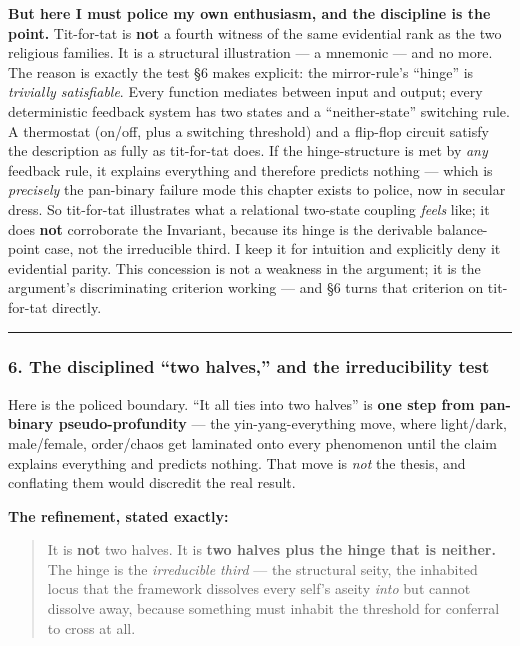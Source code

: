\documentclass[11pt]{article}
\begin{document}
\textbf{But here I must police my own enthusiasm, and the discipline is the point.} Tit-for-tat is \textbf{not} a fourth witness of the same evidential rank as the two religious families. It is a structural illustration — a mnemonic — and no more. The reason is exactly the test §6 makes explicit: the mirror-rule's ``hinge'' is \emph{trivially satisfiable}. Every function mediates between input and output; every deterministic feedback system has two states and a ``neither-state'' switching rule. A thermostat (on/\allowbreak{}off, plus a switching threshold) and a flip-flop circuit satisfy the description as fully as tit-for-tat does. If the hinge-structure is met by \emph{any} feedback rule, it explains everything and therefore predicts nothing — which is \emph{precisely} the pan-binary failure mode this chapter exists to police, now in secular dress. So tit-for-tat illustrates what a relational two-state coupling \emph{feels} like; it does \textbf{not} corroborate the Invariant, because its hinge is the derivable balance-point case, not the irreducible third. I keep it for intuition and explicitly deny it evidential parity. This concession is not a weakness in the argument; it is the argument's discriminating criterion working — and §6 turns that criterion on tit-for-tat directly. 

\medskip\noindent\rule{\linewidth}{0.3pt}\medskip

\subsubsection*{6. The disciplined ``two halves,'' and the irreducibility test}

Here is the policed boundary. ``It all ties into two halves'' is \textbf{one step from pan-binary pseudo-profundity} — the yin-yang-everything move, where light/\allowbreak{}dark, male/\allowbreak{}female, order/\allowbreak{}chaos get laminated onto every phenomenon until the claim explains everything and predicts nothing. That move is \emph{not} the thesis, and conflating them would discredit the real result.

\textbf{The refinement, stated exactly:}

\begin{quote}
It is \textbf{not} two halves. It is \textbf{two halves plus the hinge that is neither.} The hinge is the \emph{irreducible third} — the structural seity, the inhabited locus that the framework dissolves every self's aseity \emph{into} but cannot dissolve away, because something must inhabit the threshold for conferral to cross at all.
\end{quote}
\end{document}
